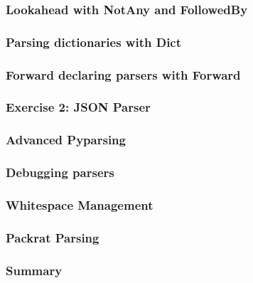 \documentclass{beamer}
\begin{document}
\begin{frame}
\frametitle{Lookahead with NotAny and FollowedBy}
\end{frame}

\begin{frame}
\frametitle{Parsing dictionaries with Dict}
\end{frame}


\begin{frame}
\frametitle{Forward declaring parsers with Forward}
\end{frame}


\begin{frame}
\frametitle{Exercise 2: JSON Parser}
\end{frame}

\begin{frame}
\frametitle{Advanced Pyparsing}
\end{frame}


\begin{frame}
\frametitle{Debugging parsers}
\end{frame}

\begin{frame}
\frametitle{Whitespace Management}
\end{frame}


\begin{frame}
\frametitle{Packrat Parsing}
\end{frame}



\begin{frame}
\frametitle{Summary}
\end{frame}
\end{document}
